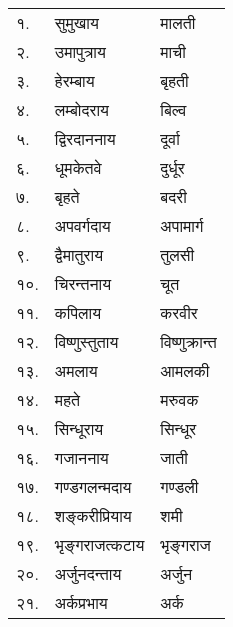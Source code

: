 \begin{center}
\begin{longtable}{ll@{~नमः — }l@{-पत्रं समर्पयामि}}
    १. & सुमुखाय &  मालती\\
    २. & उमापुत्राय &  माची\\
    ३. & हेरम्बाय & बृहती\\
    ४. & लम्बोदराय &  बिल्व\\
    ५. & द्विरदाननाय &  दूर्वा\\
    ६. & धूमकेतवे &  दुर्धूर\\
    ७. & बृहते &  बदरी\\
    ८. & अपवर्गदाय & अपामार्ग\\
    ९. & द्वैमातुराय &  तुलसी\\
    १०. & चिरन्तनाय &  चूत\\
    ११. & कपिलाय &  करवीर\\
    १२. & विष्णुस्तुताय &  विष्णुक्रान्त\\
    १३. & अमलाय &  आमलकी\\
    १४. & महते &  मरुवक\\
    १५. & सिन्धूराय &  सिन्धूर\\
    १६. & गजाननाय &  जाती\\
    १७. & गण्डगलन्मदाय &  गण्डली\\
    १८. & शङ्करीप्रियाय &  शमी\\
    १९. & भृङ्गराजत्कटाय &  भृङ्गराज\\
    २०. & अर्जुनदन्ताय &  अर्जुन\\
    २१. & अर्कप्रभाय &  अर्क\\
\end{longtable}
    



\end{center}
